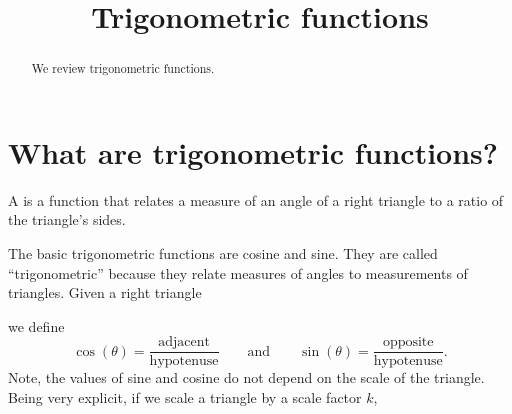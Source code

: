 \documentclass{ximera}
\title[Dig-In:]{Trigonometric functions}
\begin{document}
\begin{abstract}
  We review trigonometric functions.
\end{abstract}
\maketitle



\section{What are trigonometric functions?}

\begin{definition}
  A  is a function that relates a measure
  of an angle of a right triangle to a ratio of the triangle's sides.
\end{definition}


The basic trigonometric functions are cosine and sine. They are called
``trigonometric'' because they relate measures of angles to
measurements of triangles. Given a right triangle
\begin{image}
\end{image}
we define
\[
\cos(\theta) =
\frac{\text{adjacent}}{\text{hypotenuse}}\qquad\text{and}\qquad\sin(\theta)
= \frac{\text{opposite}}{\text{hypotenuse}}.
\]
Note, the values of sine and cosine do not depend on the scale of the
triangle. Being very explicit, if we scale a triangle by a scale
factor $k$,
\end{document}
